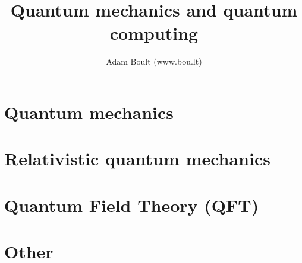 \documentclass[oneside]{book}
\begin{document}
\author{Adam Boult (www.bou.lt)}
\title{Quantum mechanics and quantum computing}
\maketitle

\setcounter{tocdepth}{0}
\tableofcontents



\part{Quantum mechanics}



\part{Relativistic quantum mechanics}


\part{Quantum Field Theory (QFT)}


\part{Other}

\end{document}
